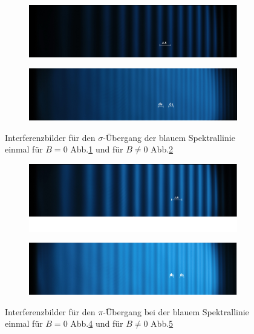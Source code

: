 \begin{figure}
   \centering
   \begin{subfigure}{0.9\textwidth}
     \centering
     \includegraphics[width=1\textwidth]{blau_sigma_B=0.jpg}
     \caption{}
     \label{fig:blau_sigB=0}
   \end{subfigure}
   \begin{subfigure}{0.9\textwidth}
     \centering
     \includegraphics[width=1\textwidth]{blau_sigma_B=!0.jpg}
     \caption{}
     \label{fig:blau_sigB=!0}
   \end{subfigure}
\caption{Interferenzbilder für den $\sigma$-Übergang
  der blauem Spektrallinie einmal für $B=0$
  Abb.\ref{fig:blau_sigB=0} und für $B\neq0$ Abb.\ref{fig:blau_sigB=!0}}
\label{fig:blau_sig}
\end{figure}




\begin{figure}
   \centering
   \begin{subfigure}{0.9\textwidth}
     \centering
     \includegraphics[width=1\textwidth]{blau_pi_B=0.jpg}
     \caption{}
     \label{fig:blau_piB=0}
   \end{subfigure}
   \begin{subfigure}{0.9\textwidth}
     \centering
     \includegraphics[width=1\textwidth]{blau_pi_B=!0.jpg}
     \caption{}
     \label{fig:blau_piB=!0}
   \end{subfigure}
\caption{Interferenzbilder für den $\pi$-Übergang
bei der blauem Spektrallinie einmal
für $B=0$ Abb.\ref{fig:blau_piB=0}
und für $B\neq0$ Abb.\ref{fig:blau_piB=!0}}
\label{fig:blau_pi}
\end{figure}

